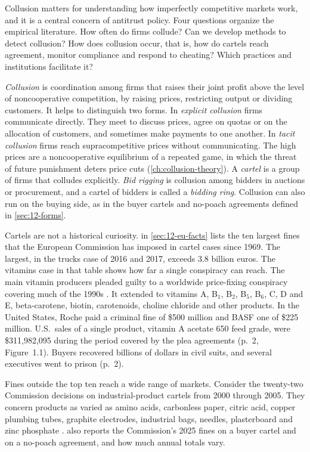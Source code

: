 Collusion matters for understanding how imperfectly competitive markets work, and it is a central concern of
antitrust policy. Four questions organize the empirical literature. How often do firms collude? Can we develop
methods to detect collusion? How does collusion occur, that is, how do cartels reach agreement, monitor compliance
and respond to cheating? Which practices and institutions facilitate it?

\emph{Collusion} is coordination among firms that raises their joint profit above the level of noncooperative
competition, by raising prices, restricting output or dividing customers. It helps to distinguish two forms. In
\emph{explicit collusion} firms communicate directly. They meet to discuss prices, agree on quotas or on the
allocation of customers, and sometimes make payments to one another. In \emph{tacit collusion} firms reach
supracompetitive prices without communicating. The high prices are a noncooperative equilibrium of a repeated game,
in which the threat of future punishment deters price cuts (\cref{ch:collusion-theory}). A \emph{cartel} is a group
of firms that colludes explicitly. \emph{Bid rigging} is collusion among bidders in auctions or procurement, and a
cartel of bidders is called a \emph{bidding ring}. Collusion can also run on the buying side, as in the buyer cartels
and no-poach agreements defined in \cref{sec:12-forms}.

Cartels are not a historical curiosity.  in \cref{sec:12-eu-facts} lists the ten largest fines
that the European Commission has imposed in cartel cases since 1969. The largest, in the trucks case of 2016 and
2017, exceeds 3.8 billion euros. The vitamins case in that table shows how far a single conspiracy can reach. The
main vitamin producers pleaded guilty to a worldwide price-fixing conspiracy covering much of the 1990s
\citep[p.~1]{MarshallMarx2012}. It extended to vitamins A, B$_1$, B$_2$, B$_5$, B$_6$, C, D and E, beta-carotene,
biotin, carotenoids, choline chloride and other products. In the United States, Roche paid a criminal fine of \$500 million and BASF one of
\$225 million. U.S.\ sales of a single product, vitamin A acetate 650 feed grade, were \$311{,}982{,}095 during the
period covered by the plea agreements (p.~2, Figure~1.1). Buyers recovered billions of dollars in civil suits, and
several executives went to prison (p.~2).

Fines outside the top ten reach a wide range of markets. Consider the twenty-two Commission decisions on
industrial-product cartels from 2000 through 2005. They concern products as varied as amino acids, carbonless paper, citric
acid, copper plumbing tubes, graphite electrodes, industrial bags, needles, plasterboard and zinc phosphate
\citep[pp.~125--127, Table~6.1]{MarshallMarx2012}.  also reports the Commission's 2025 fines
on a buyer cartel and on a no-poach agreement, and how much annual totals vary.

